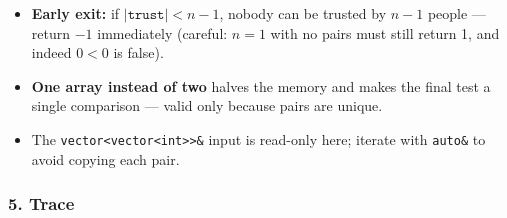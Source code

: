 \begin{tricksbox}
\begin{itemize}[leftmargin=*]
    \item \textbf{Early exit:} if $|\texttt{trust}| < n-1$, nobody can be trusted by $n-1$ people --- return $-1$ immediately (careful: $n = 1$ with no pairs must still return 1, and indeed $0 < 0$ is false).
    \item \textbf{One array instead of two} halves the memory and makes the final test a single comparison --- valid only because pairs are unique.
    \item The \texttt{vector<vector<int>>\&} input is read-only here; iterate with \texttt{auto\&} to avoid copying each pair.
\end{itemize}
\end{tricksbox}

\subsubsection*{5. Trace}

